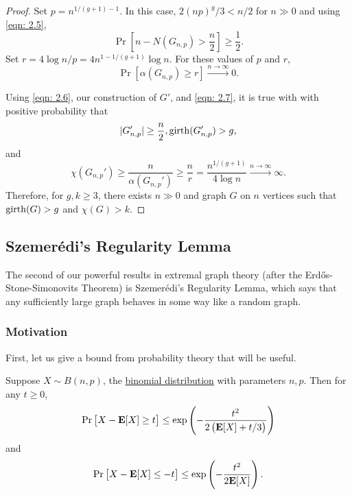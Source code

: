 \begin{proof}
				Set $p = n^{1/(g+1) - 1}$. In this case, $2(np)^g/3 < n/2$ for $n\gg 0$ and using \eqref{eqn: 2.5},
				\begin{equation}
					\label{eqn: 2.6}
					\Pr\left[ n - N(G_{n,p}) > \frac{n}{2} \right] \ge \frac{1}{2}.
				\end{equation}
				Set $r = 4 \log n / p = 4 n^{1 - 1/(g+1)} \log n$. For these values of $p$ and $r$,
				\begin{equation}
					\label{eqn: 2.7}
					\Pr\left[\alpha(G_{n,p}) \ge r\right] \xrightarrow{n\to\infty} 0.
				\end{equation}

				Using \eqref{eqn: 2.6}, our construction of $G'$, and \eqref{eqn: 2.7}, it is true with with positive probability that
				\[ |G_{n,p}'| \ge \frac{n}{2}, \operatorname{girth}(G_{n,p}') > g, \]
				and
				\[ \chi(G_{n,p}') \ge \frac{n}{\alpha(G_{n,p}')} \ge \frac{n}{r} = \frac{n^{1/(g+1)}}{4\log n} \xrightarrow{n\to\infty} \infty. \]
				Therefore, for $g,k \ge 3$, there exists $n\gg 0$ and graph $G$ on $n$ vertices such that $\operatorname{girth}(G) > g$ and $\chi(G) > k$. 
			\end{proof}

	\subsection{Szemer\'{e}di's Regularity Lemma}

		The second of our powerful results in extremal graph theory (after the Erd\H{o}s-Stone-Simonovits Theorem) is Szemer\'{e}di's Regularity Lemma, which says that any sufficiently large graph behaves in some way like a random graph.

		\subsubsection{Motivation}

			First, let us give a bound from probability theory that will be useful.

			\begin{flem}
				\label{chernoff bound}
				Suppose $X \sim B(n,p)$, the \href{https://en.wikipedia.org/wiki/Binomial_distribution}{binomial distribution} with parameters $n,p$. Then for any $t \ge 0$,
				\[ \Pr\left[ X - \textbf{E}[X] \ge t \right] \le \exp\left(-\frac{t^2}{2\left(\textbf{E}[X] + t/3\right)}\right) \]
				and
				\[ \Pr\left[ X - \textbf{E}[X] \le -t \right] \le \exp\left(-\frac{t^2}{2\textbf{E}[X]}\right). \]
			\end{flem}

